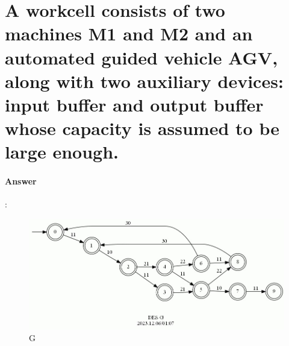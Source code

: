 \documentclass{article}
\begin{document}
  


\section{A workcell consists of two machines M1 and M2 and an automated guided vehicle AGV, along with two auxiliary devices: input buffer and output buffer whose capacity is assumed to be large enough.}

\paragraph{Answer}:

\begin{figure}[h]
  \centering
  \includegraphics[width=\linewidth]{assets/findg.jpg}
  \caption{G}
  \label{fig:findg}
\end{figure}
\end{document}
